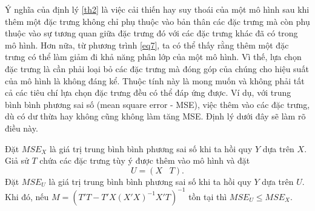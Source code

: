 Ý nghĩa của định lý \ref{th2} là việc cải thiến hay suy thoái của một mô hình sau khi thêm một đặc trưng không chỉ phụ thuộc vào bản thân các đặc trưng mà còn phụ thuộc vào sự tương quan giữa đặc trưng đó với các đặc trưng khác đã có trong mô hình. Hơn nữa, từ phương trình \ref{eq7}, ta có thể thấy rằng thêm một đặc trưng có thể làm giảm đi khả năng phân lớp của một mô hình. Vì thế, lựa chọn đặc trưng là cần phải loại bỏ các đặc trưng mà đóng góp của chúng cho hiệu suất của mô hình là không đáng kể. Thuộc tính này là mong muốn và không phải tất cả các tiêu chí lựa chọn đặc trưng đều có thể đáp ứng được. Ví dụ, với trung bình bình phương sai số (mean square error - MSE), việc thêm vào các đặc trưng, dù có dư thừa hay không cũng không làm tăng MSE. Định lý dưới đây sẽ làm rõ điều này.

\begin{theorem} \label{th3}
	Đặt $MSE_X$ là giá trị trung bình bình phương sai số khi ta hồi quy $Y$ dựa trên $X$. Giả sử $T$ chứa các đặc trưng tùy ý được thêm vào mô hình và đặt
	\begin{equation}
		U = (X\;\;\;T).
	\end{equation}
	Đặt $MSE_U$ là giá trị trung bình bình phương sai số khi ta hồi quy $Y$ dựa trên $U$. Khi đó, nếu $M = (T'T - T'X(X'X)^{-1}X'T)^{-1}$ tồn tại thì $MSE_U \le MSE_X$.
\end{theorem}
